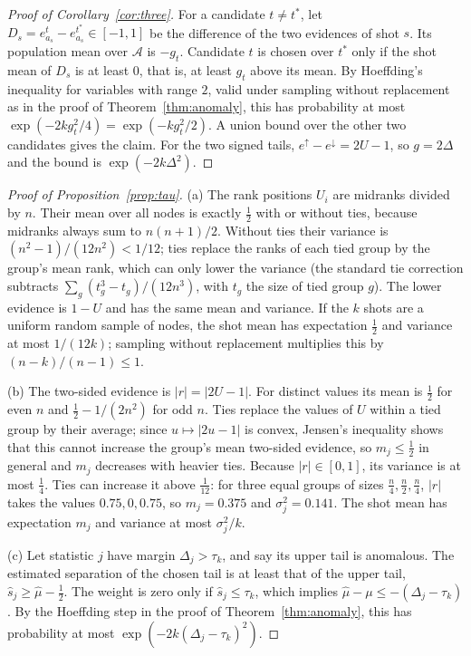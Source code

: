 \begin{proof}[Proof of Corollary~\ref{cor:three}]
For a candidate $t \ne t^*$, let $D_s = e^{t}_{a_s} - e^{t^*}_{a_s} \in [-1,1]$ be the difference of the two evidences of shot $s$. Its population mean over $\mathcal{A}$ is $-g_t$. Candidate $t$ is chosen over $t^*$ only if the shot mean of $D_s$ is at least $0$, that is, at least $g_t$ above its mean. By Hoeffding's inequality for variables with range $2$, valid under sampling without replacement as in the proof of Theorem~\ref{thm:anomaly}, this has probability at most $\exp(-2k g_t^2/4) = \exp(-k g_t^2/2)$. A union bound over the other two candidates gives the claim. For the two signed tails, $e^{\uparrow} - e^{\downarrow} = 2U - 1$, so $g = 2\Delta$ and the bound is $\exp(-2k\Delta^2)$.
\end{proof}

\begin{proof}[Proof of Proposition~\ref{prop:tau}]
(a) The rank positions $U_i$ are midranks divided by $n$. Their mean over all nodes is exactly $\tfrac12$ with or without ties, because midranks always sum to $n(n+1)/2$. Without ties their variance is $(n^2-1)/(12n^2) < 1/12$; ties replace the ranks of each tied group by the group's mean rank, which can only lower the variance (the standard tie correction subtracts $\sum_g (t_g^3 - t_g)/(12n^3)$, with $t_g$ the size of tied group $g$). The lower evidence is $1-U$ and has the same mean and variance. If the $k$ shots are a uniform random sample of nodes, the shot mean has expectation $\tfrac12$ and variance at most $1/(12k)$; sampling without replacement multiplies this by $(n-k)/(n-1) \le 1$.

(b) The two-sided evidence is $|r| = |2U-1|$. For distinct values its mean is $\tfrac12$ for even $n$ and $\tfrac12 - 1/(2n^2)$ for odd $n$. Ties replace the values of $U$ within a tied group by their average; since $u \mapsto |2u-1|$ is convex, Jensen's inequality shows that this cannot increase the group's mean two-sided evidence, so $m_j \le \tfrac12$ in general and $m_j$ decreases with heavier ties. Because $|r| \in [0,1]$, its variance is at most $\tfrac14$. Ties can increase it above $\tfrac1{12}$: for three equal groups of sizes $\tfrac n4, \tfrac n2, \tfrac n4$, $|r|$ takes the values $0.75, 0, 0.75$, so $m_j = 0.375$ and $\sigma_j^2 = 0.141$. The shot mean has expectation $m_j$ and variance at most $\sigma_j^2/k$.

(c) Let statistic $j$ have margin $\Delta_j > \tau_k$, and say its upper tail is anomalous. The estimated separation of the chosen tail is at least that of the upper tail, $\hat s_j \ge \hat\mu - \tfrac12$. The weight is zero only if $\hat s_j \le \tau_k$, which implies $\hat\mu - \mu \le -(\Delta_j - \tau_k)$. By the Hoeffding step in the proof of Theorem~\ref{thm:anomaly}, this has probability at most $\exp(-2k(\Delta_j - \tau_k)^2)$.
\end{proof}
